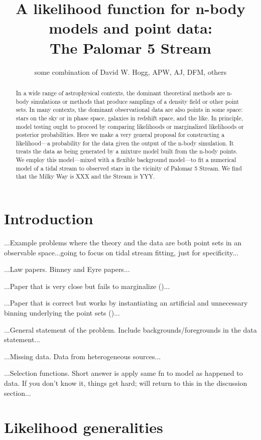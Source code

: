 \documentclass[12pt,pdftex,preprint]{aastex}
\begin{document}
\title{A likelihood function for n-body models and point data:\\
       The Palomar 5 Stream}
\author{some combination of David W. Hogg, APW, AJ, DFM, others}

\begin{abstract}
In a wide range of astrophysical contexts, the dominant theoretical
methods are n-body simulations or methods that produce samplings of a
density field or other point sets.  In many contexts, the dominant
observational data are also points in some space: stars on the sky or
in phase space, galaxies in redshift space, and the like.  In
principle, model testing ought to proceed by comparing likelihoods or
marginalized likelihoods or posterior probabilities.  Here we make a
very general proposal for constructing a likelihood---a probability
for the data given the output of the n-body simulation.  It treats the
data as being generated by a mixture model built from the n-body
points.  We employ this model---mixed with a flexible background
model---to fit a numerical model of a tidal stream to observed stars
in the vicinity of Palomar 5 Stream.  We find that the Milky Way is
XXX and the Stream is YYY.
\end{abstract}

\section{Introduction}

...Example problems where the theory and the data are both point sets
in an observable space...going to focus on tidal stream fitting, just
for specificity...

...Law papers.  Binney and Eyre papers...

...Paper that is very close but fails to marginalize
(\citealt{varghese})...

...Paper that is correct but works by instantiating an artificial and
unnecessary binning underlying the point sets (\citealt{saha})...

...General statement of the problem.  Include backgrounds/foregrounds
in the data statement...

...Missing data.  Data from heterogeneous sources...

...Selection functions.  Short answer is apply same fn to model as
happened to data.  If you don't know it, things get hard; will return
to this in the discussion section...

\section{Likelihood generalities}
\end{document}
